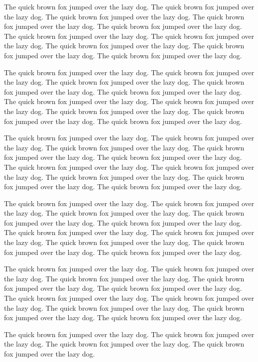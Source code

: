 \documentclass{article}
\begin{document}
The quick brown fox jumped over the lazy dog.
The quick brown fox jumped over the lazy dog.
The quick brown fox jumped over the lazy dog.
The quick brown fox jumped over the lazy dog.
The quick brown fox jumped over the lazy dog.
The quick brown fox jumped over the lazy dog.
The quick brown fox jumped over the lazy dog.
The quick brown fox jumped over the lazy dog.
The quick brown fox jumped over the lazy dog.
The quick brown fox jumped over the lazy dog.

The quick brown fox jumped over the lazy dog.
The quick brown fox jumped over the lazy dog.
The quick brown fox jumped over the lazy dog.
The quick brown fox jumped over the lazy dog.
The quick brown fox jumped over the lazy dog.
The quick brown fox jumped over the lazy dog.
The quick brown fox jumped over the lazy dog.
The quick brown fox jumped over the lazy dog.
The quick brown fox jumped over the lazy dog.
The quick brown fox jumped over the lazy dog.

The quick brown fox jumped over the lazy dog.
The quick brown fox jumped over the lazy dog.
The quick brown fox jumped over the lazy dog.
The quick brown fox jumped over the lazy dog.
The quick brown fox jumped over the lazy dog.
The quick brown fox jumped over the lazy dog.
The quick brown fox jumped over the lazy dog.
The quick brown fox jumped over the lazy dog.
The quick brown fox jumped over the lazy dog.
The quick brown fox jumped over the lazy dog.

The quick brown fox jumped over the lazy dog.
The quick brown fox jumped over the lazy dog.
The quick brown fox jumped over the lazy dog.
The quick brown fox jumped over the lazy dog.
The quick brown fox jumped over the lazy dog.
The quick brown fox jumped over the lazy dog.
The quick brown fox jumped over the lazy dog.
The quick brown fox jumped over the lazy dog.
The quick brown fox jumped over the lazy dog.
The quick brown fox jumped over the lazy dog.

The quick brown fox jumped over the lazy dog.
The quick brown fox jumped over the lazy dog.
The quick brown fox jumped over the lazy dog.
The quick brown fox jumped over the lazy dog.
The quick brown fox jumped over the lazy dog.
The quick brown fox jumped over the lazy dog.
The quick brown fox jumped over the lazy dog.
The quick brown fox jumped over the lazy dog.
The quick brown fox jumped over the lazy dog.
The quick brown fox jumped over the lazy dog.

The quick brown fox jumped over the lazy dog.
The quick brown fox jumped over the lazy dog.
The quick brown fox jumped over the lazy dog.
The quick brown fox jumped over the lazy dog.
\end{document}
